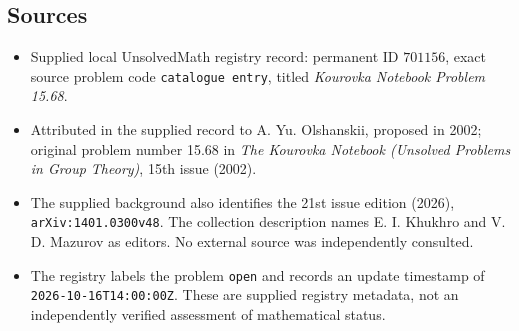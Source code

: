 \documentclass[11pt]{article}
\begin{document}
\subsection{Sources}
\begin{itemize}
\item Supplied local UnsolvedMath registry record: permanent ID \(701156\), exact source problem code \texttt{catalogue entry}, titled \emph{Kourovka Notebook Problem 15.68}.
\item Attributed in the supplied record to A. Yu. Olshanskii, proposed in 2002; original problem number 15.68 in \emph{The Kourovka Notebook (Unsolved Problems in Group Theory)}, 15th issue (2002).
\item The supplied background also identifies the 21st issue edition (2026), \texttt{arXiv:1401.0300v48}. The collection description names E. I. Khukhro and V. D. Mazurov as editors. No external source was independently consulted.
\item The registry labels the problem \texttt{open} and records an update timestamp of \texttt{2026-10-16T14:00:00Z}. These are supplied registry metadata, not an independently verified assessment of mathematical status.
\end{itemize}
\end{document}
